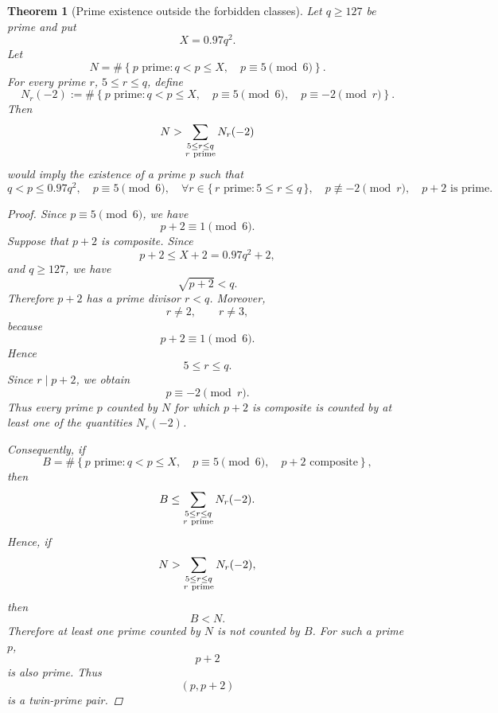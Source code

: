 \documentclass[11pt,a4paper]{article}
\newtheorem{theorem}{Theorem}[section]
\theoremstyle{definition}
\theoremstyle{remark}
\begin{document}
\begin{theorem}[Prime existence outside the forbidden classes]
Let \(q\ge127\) be prime and put
\[
X=0.97q^2.
\]
Let
\[
N
=
\#\left\{
p\text{ prime}:
q<p\le X,\quad p\equiv5\pmod6
\right\}.
\]
For every prime \(r\), \(5\le r\le q\), define
\[
N_r(-2)
:=
\#\left\{
p\text{ prime}:
q<p\le X,\quad
p\equiv5\pmod6,\quad
p\equiv-2\pmod r
\right\}.
\]
Then
\[
N
>
\sum_{\substack{5\le r\le q\\r\ {\rm prime}}}
N_r(-2)
\]
would imply the existence of a prime \(p\) such that
\[
q<p\le0.97q^2,
\quad
p\equiv5\pmod6,
\quad
\forall r\in\{\,r\text{ prime}:5\le r\le q\,\},\quad
p\not\equiv -2\pmod r,
\quad
p+2\text{ is prime}.
\]
\begin{proof}
Since \(p\equiv5\pmod6\), we have
\[
p+2\equiv1\pmod6.
\]
Suppose that \(p+2\) is composite. Since
\[
p+2\le X+2=0.97q^2+2,
\]
and \(q\ge127\), we have
\[
\sqrt{p+2}<q.
\]
Therefore \(p+2\) has a prime divisor \(r<q\). Moreover,
\[
r\neq2,\qquad r\neq3,
\]
because
\[
p+2\equiv1\pmod6.
\]
Hence
\[
5\le r\le q.
\]
Since \(r\mid p+2\), we obtain
\[
p\equiv-2\pmod r.
\]
Thus every prime \(p\) counted by \(N\) for which \(p+2\) is composite is counted by at least one of the quantities \(N_r(-2)\).

Consequently, if
\[
B=
\#\left\{
p\text{ prime}:
q<p\le X,\quad
p\equiv5\pmod6,\quad
p+2\text{ composite}
\right\},
\]
then
\[
B
\le
\sum_{\substack{5\le r\le q\\r\ {\rm prime}}}
N_r(-2).
\]
Hence, if
\[
N>
\sum_{\substack{5\le r\le q\\r\ {\rm prime}}}
N_r(-2),
\]
then
\[
B<N.
\]
Therefore at least one prime counted by \(N\) is not counted by \(B\). For such a prime \(p\),
\[
p+2
\]
is also prime. Thus
\[
(p,p+2)
\]
is a twin-prime pair.
\end{proof}
\end{theorem}
\end{document}
